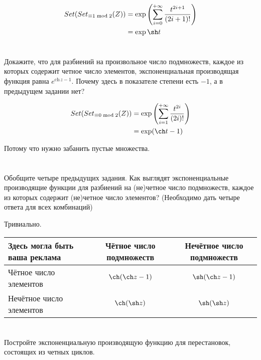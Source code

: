 \begin{align*}
    Set(Set_{\equiv 1\bmod 2}(Z)) & = \exp\left( \sum_{i = 0}^{+\infty} \frac{t^{2i + 1}}{(2i + 1)!} \right) \\
                                  & = \exp\sh t                                                              \\
\end{align*}

\section{}
Докажите, что для разбиений на произвольное число подмножеств, каждое из которых содержит четное число элементов, экспоненциальная производящая функция равна \(e^{\mathrm{ch}\,z-1}\). Почему здесь в показателе степени есть \(-1\), а в предыдущем задании нет?

\begin{align*}
    Set(Set_{\equiv 0\bmod 2}(Z)) & = \exp\left( \sum_{i = 1}^{+\infty} \frac{t^{2i}}{(2i)!} \right) \\
                                  & = \exp(\ch t - 1)
\end{align*}

Потому что нужно забанить пустые множества.

\section{}
Обобщите четыре предыдущих задания. Как выглядят экспоненциальные производящие функции для разбиений на (не)четное число подмножеств, каждое из которых содержит (не)четное число элементов? (Необходимо дать четыре ответа для всех комбинаций)

Тривиально.

\begin{tabular}{p{5cm}|c|c}
    \toprule
    Здесь могла быть ваша реклама & Чётное число подмножеств & Нечётное число подмножеств \\
    \midrule
    Чётное число элементов        & \(\ch (\ch z - 1)\)      & \(\sh (\ch z - 1)\)        \\
    Нечётное число элементов      & \(\ch (\sh z)\)          & \(\sh (\sh z)\)            \\
    \bottomrule
\end{tabular}

\section{}
Постройте экспоненциальную производящую функцию для перестановок, состоящих из четных циклов.

